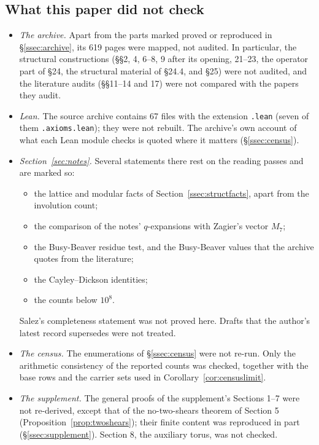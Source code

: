 \subsection{What this paper did not check}

\begin{itemize}
\item \emph{The archive.} Apart from the parts marked proved or reproduced in §\ref{ssec:archive}, its 619 pages were mapped, not audited. In particular, the structural constructions (§§2, 4, 6--8, 9 after its opening, 21--23, the operator part of §24, the structural material of §24.4, and §25) were not audited, and the literature audits (§§11--14 and 17) were not compared with the papers they audit.
\item \emph{Lean.} The source archive contains 67 files with the extension \texttt{.lean} (seven of them \texttt{.axioms.lean}); they were not rebuilt. The archive's own account of what each Lean module checks is quoted where it matters (§\ref{ssec:census}).
\item \emph{Section~\ref{sec:notes}.} Several statements there rest on the reading passes and are marked so:
\begin{itemize}
\item the lattice and modular facts of Section~\ref{ssec:structfacts}, apart from the involution count;
\item the comparison of the notes' $q$-expansions with Zagier's vector $M_7$;
\item the Busy-Beaver residue test, and the Busy-Beaver values that the archive quotes from the literature;
\item the Cayley--Dickson identities;
\item the counts below $10^8$.
\end{itemize}
Salez's completeness statement was not proved here. Drafts that the author's latest record supersedes were not treated.
\item \emph{The census.} The enumerations of §\ref{ssec:census} were not re-run. Only the arithmetic consistency of the reported counts was checked, together with the base rows and the carrier sets used in Corollary~\ref{cor:censuslimit}.
\item \emph{The supplement.} The general proofs of the supplement's Sections 1--7 were not re-derived, except that of the no-two-shears theorem of Section 5 (Proposition~\ref{prop:twoshears}); their finite content was reproduced in part (§\ref{ssec:supplement}). Section 8, the auxiliary torus, was not checked.

\end{itemize}
